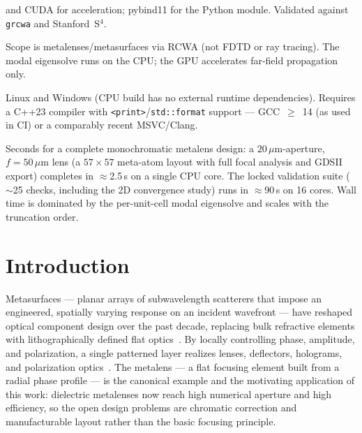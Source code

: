 \documentclass[preprint,12pt]{elsarticle}
\begin{document}
\begin{description}
      and CUDA for acceleration; pybind11 for the Python module. Validated against
      \texttt{grcwa} and Stanford~S$^4$.
\item[Restrictions:] Scope is metalenses/metasurfaces via RCWA (not FDTD or ray
      tracing). The modal eigensolve runs on the CPU; the GPU accelerates far-field
      propagation only.
\item[Operating systems:] Linux and Windows (CPU build has no external runtime
      dependencies). Requires a C++23 compiler with \texttt{<print>}/\texttt{std::format}
      support --- GCC~$\geq$~14 (as used in CI) or a comparably recent MSVC/Clang.
\item[Running time:] Seconds for a complete monochromatic metalens design: a
      $20\,\mu$m-aperture, $f=50\,\mu$m lens (a $57\times57$ meta-atom layout with
      full focal analysis and GDSII export) completes in $\approx$2.5\,s on a single
      CPU core. The locked validation suite ($\sim$25 checks, including the 2D
      convergence study) runs in $\approx$90\,s on 16 cores. Wall time is dominated
      by the per-unit-cell modal eigensolve and scales with the truncation order.
\end{description}

\section{Introduction}
Metasurfaces --- planar arrays of subwavelength scatterers that impose an
engineered, spatially varying response on an incident wavefront --- have reshaped
optical component design over the past decade, replacing bulk refractive elements
with lithographically defined flat optics~\cite{yu2011,yu2014flat,kildishev2013}.
By locally controlling phase, amplitude, and polarization, a single patterned layer
realizes lenses, deflectors, holograms, and polarization
optics~\cite{arbabi2015}. The metalens --- a flat focusing element built from a
radial phase profile --- is the canonical example and the motivating application of
this work: dielectric metalenses now reach high numerical aperture and high
efficiency, so the open design problems are chromatic correction and manufacturable
layout rather than the basic focusing principle.
\end{document}
